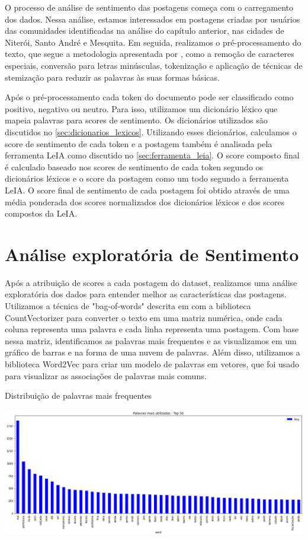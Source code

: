 O processo de análise de sentimento das postagens começa com o carregamento dos dados. Nessa análise, estamos interessados em postagens criadas por usuários das comunidades identificadas na análise do capítulo anterior, nas cidades de Niterói, Santo André e Mesquita. Em seguida, realizamos o pré-processamento do texto, que segue a metodologia apresentada por , como a remoção de caracteres especiais, conversão para letras minúsculas, tokenização e aplicação de técnicas de stemização para reduzir as palavras às suas formas básicas.

Após o pré-processamento cada token do documento pode ser classificado como positivo, negativo ou neutro. Para isso, utilizamos um dicionário léxico que mapeia palavras para scores de sentimento. Os dicionários utilizados são discutidos no \autoref{sec:dicionarios_lexicos}. Utilizando esses dicionários, calculamos o score de sentimento de cada token e a postagem também é analisada pela ferramenta LeIA como discutido no \autoref{sec:ferramenta_leia}. O score composto final é calculado baseado nos scores de sentimento de cada token segundo os dicionários léxicos e o score da postagem como um todo segundo a ferramenta LeIA. O score final de sentimento de cada postagem foi obtido através de uma média ponderada dos scores normalizados dos dicionários léxicos e dos scores compostos da LeIA.

\section{Análise exploratória de Sentimento}

Após a atribuição de scores a cada postagem do dataset, realizamos uma análise exploratória dos dados para entender melhor as características das postagens. Utilizamos a técnica de "bag-of-words" descrita em  com a biblioteca CountVectorizer para converter o texto em uma matriz numérica, onde cada coluna representa uma palavra e cada linha representa uma postagem. Com base nessa matriz, identificamos as palavras mais frequentes e as visualizamos em um gráfico de barras e na forma de uma nuvem de palavras. Além disso, utilizamos a biblioteca Word2Vec para criar um modelo de palavras em vetores, que foi usado para visualizar as associações de palavras mais comuns.

\begin{quadro}[!htb]
	\caption{Distribuição de palavras mais frequentes}
	\label{fig:wordcount}
	\centering
	\includegraphics[width=\textwidth]{images/wordcount.png}
	\fautor
\end{quadro}


